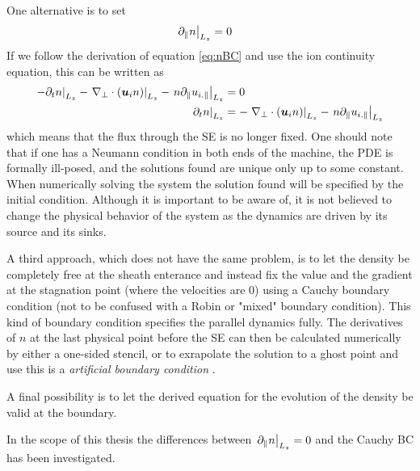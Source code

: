 One alternative is to set
%
\begin{align*}
    \left. \partial_\| n \right|_{L_z} &= 0
\end{align*}
%
If we follow the derivation of equation \ref{eq:nBC} and use the ion continuity equation, this can be written as
%
\begin{align*}
    \left.- \partial_tn \right|_{L_z}- \left.\nabla_\perp\cdot\left(\boldsymbol{u}_{i} n \right)\right|_{L_z}
    -\left.n \partial_\| u_{i.\|}\right|_{L_z}
    &= 0\\
    \left.\partial_tn \right|_{L_z}&=  - \left.\nabla_\perp\cdot\left(\boldsymbol{u}_{i} n \right)\right|_{L_z}-
    \left.n \partial_\| u_{i.\|}\right|_{L_z}
\end{align*}
%
which means that the flux through the SE is no longer fixed.
One should note that if one has a Neumann condition in both ends of the machine, the PDE is formally ill-posed, and the solutions found are unique only up to some constant.
When numerically solving the system the solution found will be specified by the initial condition.
Although it is important to be aware of, it is not believed to change the physical behavior of the system as the dynamics are driven by its source and its sinks.

A third approach, which does not have the same problem, is to let the density be completely free at the sheath enterance and instead fix the value and the gradient at the stagnation point (where the velocities are $0$) using a Cauchy boundary condition (not to be confused with a Robin or "mixed" boundary condition).
This kind of boundary condition specifies the parallel dynamics fully.
The derivatives of $n$ at the last physical point before the SE can then be calculated numerically by either a one-sided stencil, or to exrapolate the solution to a ghost point and use this is a \emph{artificial boundary condition} \cite{Leveque2007book}.

A final possibility is to let the derived equation for the evolution of the density be valid at the boundary.

In the scope of this thesis the differences between $\left. \partial_\| n \right|_{L_z} = 0$ and the Cauchy BC has been investigated.


